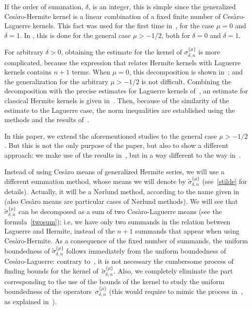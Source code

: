 \documentclass{amsart}
\theoremstyle{plain}
\theoremstyle{definition}
\theoremstyle{remark}
\newcommand{\chem}[3]{\sigma_{#1,#2}^{\{#3\}}} %
\newcommand{\chemmod}[3]{\widetilde{\sigma}_{#1,#2}^{\{#3\}}} %
\begin{document}
If the order of summation, $\delta$, is an integer,
this is simple since the generalized Ces\`aro-Hermite kernel is a
linear combination of a fixed finite number of Ces\`aro-Laguerre
kernels. This fact was used for the first time in~\cite{Po},
for the case $\mu=0$ and $\delta=1$.
In \cite[Chapter~6]{V}, this is done for the general case $\mu>-1/2$,
both for $\delta=0$ and $\delta=1$.

For arbitrary $\delta>0$, obtaining the estimate for the kernel of
$\chem{\delta}{n}{\mu}$ is more complicated,
because the expression that relates Hermite kernels with Laguerre kernels
contains $n+1$ terms. When $\mu=0$, this decomposition is shown
in~\cite[Lemma~(3.8)]{MW2}; and the generalization for the arbitrary
$\mu > -1/2$ is not difficult.
Combining the decomposition with the precise estimates
for Laguerre kernels of~\cite{W}, an estimate for classical Hermite kernels
is given in~\cite[Theorem~(4.5)]{MW2}. Then, because of the similarity of the
estimate to the Laguerre case, the norm inequalities are established
using the methods and the results of~\cite{MW}.

In this paper, we extend the aforementioned studies to the general case $\mu>-1/2$.
But this is not the only purpose of the paper, but also to show a different approach:
we make use of the results in~\cite{MW}, but in a way different to the way in~\cite{MW2}.

Instead of using Ces\`aro means of generalized Hermite series, we will use a different
summation method, whose means we will denote by $\chemmod{\delta}{n}{\mu}$
(see~\eqref{stilde} for details). Actually, it will be a N{\o}rlund method,
according to the name given in~\cite[Chapter~IV]{H} (also Ces\`aro means are particular
cases of N{\o}rlund methods).
We will see that $\chemmod{\delta}{n}{\mu}$ can be decomposed as a sum of two
Ces\`aro-Laguerre means (see the formula~\eqref{twosum}); i.e, we have only two summands
in the relation between Laguerre and Hermite, instead of the $n+1$ summands that
appear when using Ces\`aro-Hermite. As a consequence of the fixed number of summands,
the uniform boundedness of $\chemmod{\delta}{n}{\mu}$ follows immediately from the
uniform boundedness of
Ces\`aro-Laguerre: contrary to~\cite{MW2}, it is not necessary the cumbersome process
of finding bounds for the kernel of~$\chemmod{\delta}{n}{\mu}$. Also, we completely
eliminate the part corresponding to the use of the bounds of the kernel to study
the uniform boundedness of the operators~$\chem{\delta}{n}{\mu}$ (this would require
to mimic the process in~\cite{MW}, as explained in~\cite{MW2}).
\end{document}
